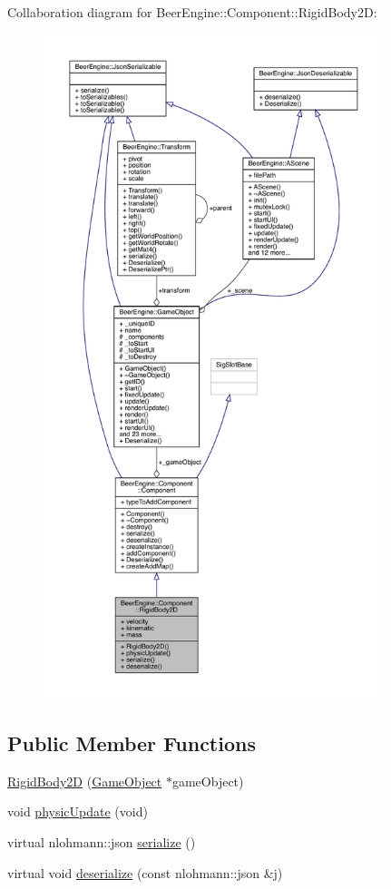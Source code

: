 Collaboration diagram for Beer\+Engine\+:\+:Component\+:\+:Rigid\+Body2D\+:
\nopagebreak
\begin{figure}[H]
\begin{center}
\leavevmode
\includegraphics[height=550pt]{class_beer_engine_1_1_component_1_1_rigid_body2_d__coll__graph}
\end{center}
\end{figure}
\subsection*{Public Member Functions}
\begin{DoxyCompactItemize}
\item 
\mbox{\hyperlink{class_beer_engine_1_1_component_1_1_rigid_body2_d_a5f0d9faa4cd26f4628f9af1601868e3d}{Rigid\+Body2D}} (\mbox{\hyperlink{class_beer_engine_1_1_game_object}{Game\+Object}} $\ast$game\+Object)
\item 
void \mbox{\hyperlink{class_beer_engine_1_1_component_1_1_rigid_body2_d_ab452ad926f43ec0cb06ace5f187d8efd}{physic\+Update}} (void)
\item 
virtual nlohmann\+::json \mbox{\hyperlink{class_beer_engine_1_1_component_1_1_rigid_body2_d_afd6b6d4073e564a1c536243027bb8597}{serialize}} ()
\item 
virtual void \mbox{\hyperlink{class_beer_engine_1_1_component_1_1_rigid_body2_d_ae070289cdf3c6fde105671d41ee8315a}{deserialize}} (const nlohmann\+::json \&j)
\end{DoxyCompactItemize}
